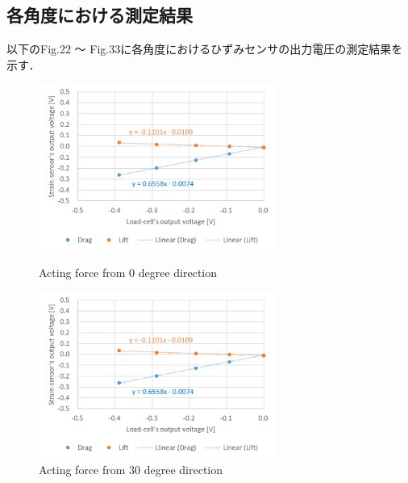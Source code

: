 \documentclass[twocolumn,a4j]{jsarticle}
\begin{document}
\subsection{各角度における測定結果}
以下のFig.22 ～ Fig.33に各角度におけるひずみセンサの出力電圧の測定結果を示す．

\begin{figure}[htbp]
    \footnotesize
    \begin{center}
        \includegraphics[width=78mm]{../images/0.png}
        \caption{Acting force from 0 degree direction}
        \includegraphics[width=78mm]{../images/30.png}
        \caption{Acting force from 30 degree direction}
    \end{center}
\end{figure}
\end{document}
